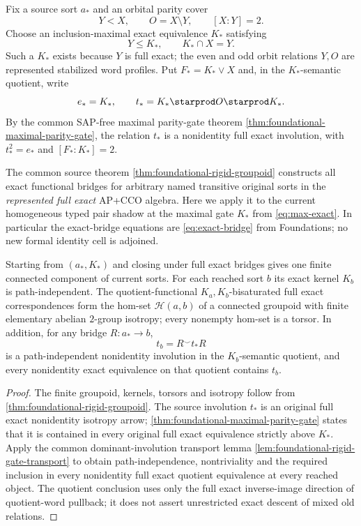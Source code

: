Fix a source sort $a_*$ and an orbital parity cover
\[
 Y<X,
 \qquad O=X\setminus Y,
 \qquad [X:Y]=2.
\]
Choose an inclusion-maximal exact equivalence $K_*$ satisfying
\[
 Y\leq K_*,
 \qquad K_*\cap X=Y.
\tag{4}\label{eq:max-exact}
\]
Such a $K_*$ exists because $Y$ is full exact; the
even and odd orbit relations $Y,O$ are represented
stabilized word profiles. Put
$F_*=K_*\vee X$ and, in the
$K_*$-semantic quotient, write
\[
 e_*=K_*,\qquad
 t_*=K_*\starprod O\starprod K_*.
\]
By the common SAP-free maximal parity-gate theorem
\cref{thm:foundational-maximal-parity-gate},
the relation $t_*$ is a nonidentity full exact
involution, with $t_*^2=e_*$ and
$[F_*:K_*]=2$.



The common source theorem
\cref{thm:foundational-rigid-groupoid} constructs all exact
functional bridges for arbitrary named transitive original
sorts in the \emph{represented full exact} AP+CCO algebra.
Here we apply it to the current homogeneous typed pair shadow
at the maximal gate $K_*$ from \eqref{eq:max-exact}.
In particular the exact-bridge equations are
\eqref{eq:exact-bridge} from Foundations;
no new formal identity cell is adjoined.

\begin{proposition}
\label{prop:rigid-bridge-groupoid}
Starting from $(a_*,K_*)$ and closing under full exact
bridges gives one finite connected component of current sorts.
For each reached sort $b$ its exact kernel $K_b$ is
path-independent. The quotient-functional $K_a,K_b$-bisaturated
full exact correspondences form the hom-set
$\mathcal H(a,b)$ of a connected groupoid with finite
elementary abelian $2$-group isotropy; every nonempty hom-set
is a torsor. In addition, for any bridge $R:a_*\to b$,
\[
             t_b=R^\smile t_*R
\]
is a path-independent nonidentity involution in the
$K_b$-semantic quotient, and every nonidentity exact
equivalence on that quotient contains $t_b$.
\end{proposition}
\begin{proof}
The finite groupoid, kernels, torsors and isotropy follow from
\cref{thm:foundational-rigid-groupoid}. The source involution
$t_*$ is an original full exact nonidentity isotropy arrow;
\cref{thm:foundational-maximal-parity-gate} states that it is
contained in every original full exact equivalence strictly
above $K_*$. Apply the common dominant-involution transport
lemma \cref{lem:foundational-rigid-gate-transport} to obtain
path-independence, nontriviality and the required inclusion
in every nonidentity full exact quotient equivalence at every
reached object. The quotient conclusion uses only the full exact
inverse-image direction of quotient-word pullback; it does not
assert unrestricted exact descent of mixed old relations.
\end{proof}





